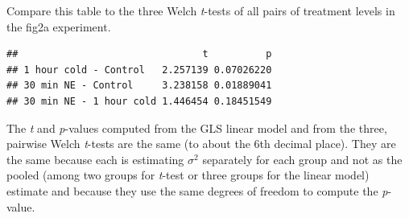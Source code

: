 \documentclass[]{book}
\newenvironment{Shaded}{\begin{snugshade}}{\end{snugshade}}
\newcommand{\DataTypeTok}[1]{\textcolor[rgb]{0.13,0.29,0.53}{#1}}
\newcommand{\KeywordTok}[1]{\textcolor[rgb]{0.13,0.29,0.53}{\textbf{#1}}}
\newcommand{\NormalTok}[1]{#1}
\newcommand{\OperatorTok}[1]{\textcolor[rgb]{0.81,0.36,0.00}{\textbf{#1}}}
\newcommand{\OtherTok}[1]{\textcolor[rgb]{0.56,0.35,0.01}{#1}}
\newcommand{\StringTok}[1]{\textcolor[rgb]{0.31,0.60,0.02}{#1}}
\begin{document}
Compare this table to the three Welch \emph{t}-tests of all pairs of treatment levels in the fig2a experiment.

\begin{Shaded}
\end{Shaded}

\begin{verbatim}
##                                t          p
## 1 hour cold - Control   2.257139 0.07026220
## 30 min NE - Control     3.238158 0.01889041
## 30 min NE - 1 hour cold 1.446454 0.18451549
\end{verbatim}

The \emph{t} and \emph{p}-values computed from the GLS linear model and from the three, pairwise Welch \emph{t}-tests are the same (to about the 6th decimal place). They are the same because each is estimating \(\sigma^2\) separately for each group and not as the pooled (among two groups for \emph{t}-test or three groups for the linear model) estimate and because they use the same degrees of freedom to compute the \emph{p}-value.
\end{document}
